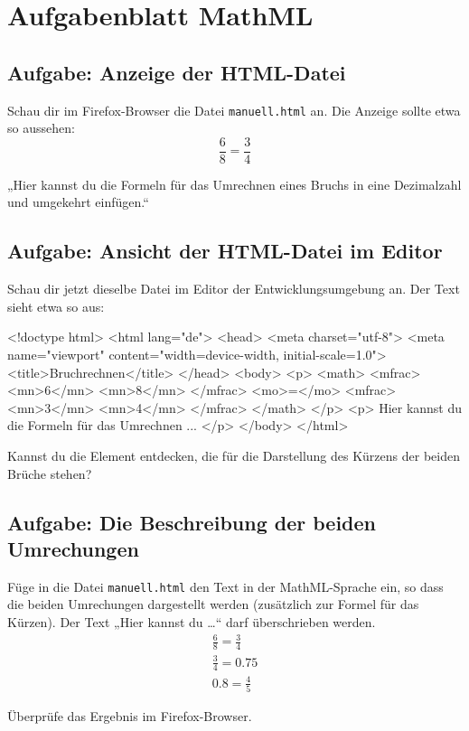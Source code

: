 \section{Aufgabenblatt MathML}

\subsection*{Aufgabe: Anzeige der HTML-Datei}

Schau dir im Firefox-Browser die Datei \texttt{manuell.html} an. Die Anzeige sollte etwa so aussehen:
\[
\frac{6}{8} = \frac{3}{4}
\]

„Hier kannst du die Formeln für das Umrechnen eines Bruchs in eine Dezimalzahl und umgekehrt einfügen.“

\subsection*{Aufgabe: Ansicht der HTML-Datei im Editor}

Schau dir jetzt dieselbe Datei im Editor der Entwicklungsumgebung an. Der Text sieht etwa so aus:

\begin{codeHTML}
<!doctype html>
<html lang="de">
	<head>
		<meta charset="utf-8">
		<meta name="viewport" content="width=device-width, initial-scale=1.0">
		<title>Bruchrechnen</title>
	</head>
	<body>
		<p>
			<math>
				<mfrac>
					<mn>6</mn>
					<mn>8</mn>
				</mfrac>
				<mo>=</mo>
				<mfrac>
					<mn>3</mn>
					<mn>4</mn>
				</mfrac>
			</math>
		</p>
		<p>
 			Hier kannst du die Formeln für das Umrechnen ...
		</p>
	</body>
</html>
\end{codeHTML}

Kannst du die Element entdecken, die für die Darstellung des Kürzens der beiden Brüche stehen?

\subsection*{Aufgabe: Die Beschreibung der beiden Umrechungen}

Füge in die Datei \texttt{manuell.html} den Text in der MathML-Sprache ein, so dass die beiden Umrechungen dargestellt werden (zusätzlich zur Formel für das Kürzen). Der Text „Hier kannst du \dots“ darf überschrieben werden.
\begin{align*}
& \frac{6}{8} = \frac{3}{4} & \\[2ex]
& \frac{3}{4} = 0.75 & \\[2ex]
& 0.8 = \frac{4}{5} & 
\end{align*}

Überprüfe das Ergebnis im Firefox-Browser.